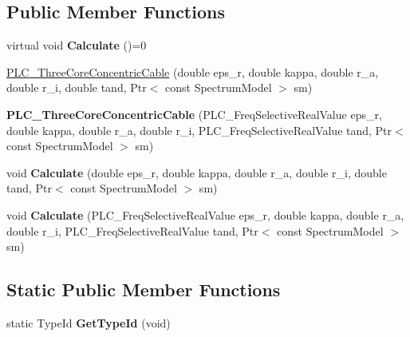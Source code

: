 \subsection*{\-Public \-Member \-Functions}
\begin{DoxyCompactItemize}
\item 
\hypertarget{classns3_1_1PLC__ThreeCoreConcentricCable_ad5314410dd027ed5c00ec08ee4fb420b}{virtual void {\bfseries \-Calculate} ()=0}\label{classns3_1_1PLC__ThreeCoreConcentricCable_ad5314410dd027ed5c00ec08ee4fb420b}

\item 
\hyperlink{classns3_1_1PLC__ThreeCoreConcentricCable_a579930ecfde382c6abf581b79cbb1558}{\-P\-L\-C\-\_\-\-Three\-Core\-Concentric\-Cable} (double eps\-\_\-r, double kappa, double r\-\_\-a, double r\-\_\-i, double tand, \-Ptr$<$ const \-Spectrum\-Model $>$ sm)
\item 
\hypertarget{classns3_1_1PLC__ThreeCoreConcentricCable_a7860d00c5bef0baa4afa3170f5eae453}{{\bfseries \-P\-L\-C\-\_\-\-Three\-Core\-Concentric\-Cable} (\-P\-L\-C\-\_\-\-Freq\-Selective\-Real\-Value eps\-\_\-r, double kappa, double r\-\_\-a, double r\-\_\-i, \-P\-L\-C\-\_\-\-Freq\-Selective\-Real\-Value tand, \-Ptr$<$ const \-Spectrum\-Model $>$ sm)}\label{classns3_1_1PLC__ThreeCoreConcentricCable_a7860d00c5bef0baa4afa3170f5eae453}

\item 
\hypertarget{classns3_1_1PLC__ThreeCoreConcentricCable_a0168c58b7a0ad4a2cff0bf00057a51f4}{void {\bfseries \-Calculate} (double eps\-\_\-r, double kappa, double r\-\_\-a, double r\-\_\-i, double tand, \-Ptr$<$ const \-Spectrum\-Model $>$ sm)}\label{classns3_1_1PLC__ThreeCoreConcentricCable_a0168c58b7a0ad4a2cff0bf00057a51f4}

\item 
\hypertarget{classns3_1_1PLC__ThreeCoreConcentricCable_a1d77573f6bdedcf9e4b2324197f6e4af}{void {\bfseries \-Calculate} (\-P\-L\-C\-\_\-\-Freq\-Selective\-Real\-Value eps\-\_\-r, double kappa, double r\-\_\-a, double r\-\_\-i, \-P\-L\-C\-\_\-\-Freq\-Selective\-Real\-Value tand, \-Ptr$<$ const \-Spectrum\-Model $>$ sm)}\label{classns3_1_1PLC__ThreeCoreConcentricCable_a1d77573f6bdedcf9e4b2324197f6e4af}

\end{DoxyCompactItemize}
\subsection*{\-Static \-Public \-Member \-Functions}
\begin{DoxyCompactItemize}
\item 
\hypertarget{classns3_1_1PLC__ThreeCoreConcentricCable_a9cc9c6bb506db5a6c5f3c227233509b4}{static \-Type\-Id {\bfseries \-Get\-Type\-Id} (void)}\label{classns3_1_1PLC__ThreeCoreConcentricCable_a9cc9c6bb506db5a6c5f3c227233509b4}

\end{DoxyCompactItemize}


